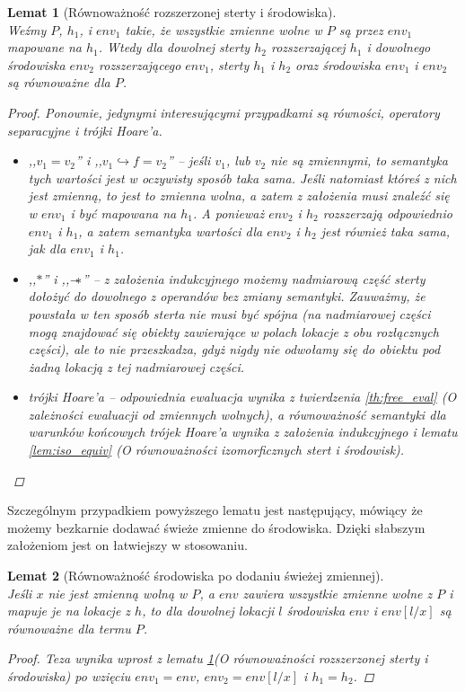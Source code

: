 \documentclass[]{pracamgr}
\newcommand \wand {\mathrel{-\mkern-6mu*}}
\renewcommand \| {\hspace{0.75em} | \hspace{0.75em} }
\renewcommand \[ {[\![}
\renewcommand \] {]\!]}
\newtheorem{lemma}{Lemat}
\theoremstyle{definition}
\begin{document}
\begin{lemma}[Równoważność rozszerzonej sterty i środowiska] {\ } \\
\label{lem:ext_equiv}
Weźmy $P$, $h_1$, i $env_1$ takie, że wszystkie zmienne wolne w $P$ są przez
$env_1$ mapowane na $h_1$. Wtedy dla dowolnej sterty $h_2$ rozszerzającej $h_1$ i dowolnego
środowiska $env_2$ rozszerzającego $env_1$, sterty $h_1$ i $h_2$ oraz środowiska $env_1$ i
$env_2$ są równoważne dla $P$.
\begin{proof}
Ponownie, jedynymi interesującymi przypadkami są równości, operatory separacyjne i 
trójki Hoare'a.
\begin{itemize}
 \item ,,$v_1 = v_2$'' i ,,$v_1 \hookrightarrow f = v_2$'' -- jeśli $v_1$, lub $v_2$
 nie są zmiennymi, to semantyka tych wartości jest w oczywisty sposób taka sama.
 Jeśli natomiast któreś z nich jest zmienną, to jest to zmienna wolna, a zatem z założenia
 musi znaleźć się w $env_1$ i być mapowana na $h_1$. A ponieważ $env_2$ i $h_2$ rozszerzają
 odpowiednio $env_1$ i $h_1$, a zatem semantyka wartości dla $env_2$ i $h_2$ jest również
 taka sama, jak dla $env_1$ i $h_1$.
 \item ,,$*$'' i ,,$\wand$'' -- z założenia indukcyjnego możemy nadmiarową część sterty
 dołożyć do dowolnego z operandów bez zmiany semantyki.
 Zauważmy, że powstała w ten sposób sterta nie musi
 być spójna (na nadmiarowej części mogą znajdować się obiekty zawierające w polach
 lokacje z obu rozłącznych części), ale to nie przeszkadza, gdyż nigdy nie odwołamy
 się do obiektu pod żadną lokacją z tej nadmiarowej części.
 \item trójki Hoare'a -- odpowiednia ewaluacja wynika z twierdzenia
 \ref{th:free_eval} (O zależności ewaluacji od zmiennych wolnych), a równoważność
 semantyki dla warunków końcowych trójek Hoare'a wynika z założenia indukcyjnego
 i lematu \ref{lem:iso_equiv} (O równoważności izomorficznych stert i środowisk).
\end{itemize}
\end{proof}
\end{lemma}

Szczególnym przypadkiem powyższego lematu jest następujący, mówiący że możemy
bezkarnie dodawać świeże zmienne do środowiska.
Dzięki słabszym założeniom jest on łatwiejszy w stosowaniu.

\begin{lemma}[Równoważność środowiska po dodaniu świeżej zmiennej] {\ } \\
\label{lem:fresh_var_equiv}
Jeśli $x$ nie jest zmienną wolną w $P$, a $env$ zawiera wszystkie zmienne wolne z $P$ i mapuje je na lokacje z $h$, to dla dowolnej lokacji $l$ środowiska $env$ i $env[l/x]$
są równoważne dla termu $P$.
\begin{proof}
Teza wynika wprost z lematu \ref{lem:ext_equiv}(O równoważności rozszerzonej sterty
i środowiska) po wzięciu $env_1 = env$, $env_2 = env[l / x]$ i
$h_1 = h_2$.
\end{proof}
\end{lemma}
\end{document}
